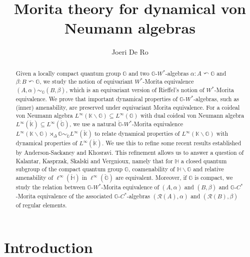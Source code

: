 \documentclass[reqno]{amsart}
\numberwithin{equation}{section}
\newcommand{\G}{\mathbb{G}}
\begin{document}
\author{Joeri De Ro}
\address{Department of Mathematics and Data Science, Vrije Universiteit Brussel, Brussels, Belgium}
\title{Morita theory for dynamical von Neumann algebras}

\begin{abstract}
Given a locally compact quantum group $\G$ and two $\G$-$W^*$-algebras $\alpha: A\curvearrowleft \G$ and $\beta: B\curvearrowleft \G$, we study the notion of equivariant $W^*$-Morita equivalence $(A, \alpha)\sim_\G (B, \beta)$, which is an equivariant version of Rieffel's notion of $W^*$-Morita equivalence. We prove that important dynamical properties of $\G$-$W^*$-algebras, such as (inner) amenability, are preserved under equivariant Morita equivalence. For a coideal von Neumann algebra $L^\infty(\mathbb{K}\backslash \G)\subseteq L^\infty(\G)$ with dual coideal von Neumann algebra $L^\infty(\check{\mathbb{K}})\subseteq L^\infty(\check{\G})$, we use a natural $\check{\G}$-$W^*$-Morita equivalence $L^\infty(\mathbb{K}\backslash \G)\rtimes_\Delta \G \sim_{\check{\G}} L^\infty(\check{\mathbb{K}})$ to relate dynamical properties of $L^\infty(\mathbb{K}\backslash \G)$ with dynamical properties of $L^\infty(\check{\mathbb{K}})$. We use this to refine some recent results established by Anderson-Sackaney and Khosravi. This refinement allows us to answer a question of Kalantar, Kasprzak, Skalski and Vergnioux, namely that for $\mathbb{H}$ a closed quantum subgroup of the compact quantum group $\G$, coamenability of $\mathbb{H}\backslash \G$ and relative amenability of $\ell^\infty(\check{\mathbb{H}})$ in $\ell^\infty(\check{\G})$ are equivalent. Moreover, if $\G$ is compact, we study the relation between $\G$-$W^*$-Morita equivalence of $(A, \alpha)$ and $(B, \beta)$ and $\G$-$C^*$-Morita equivalence of the associated $\G$-$C^*$-algebras $(\mathcal{R}(A), \alpha)$ and $(\mathcal{R}(B), \beta)$ of regular elements.
\end{abstract}
\maketitle

\section{Introduction}
\end{document}
